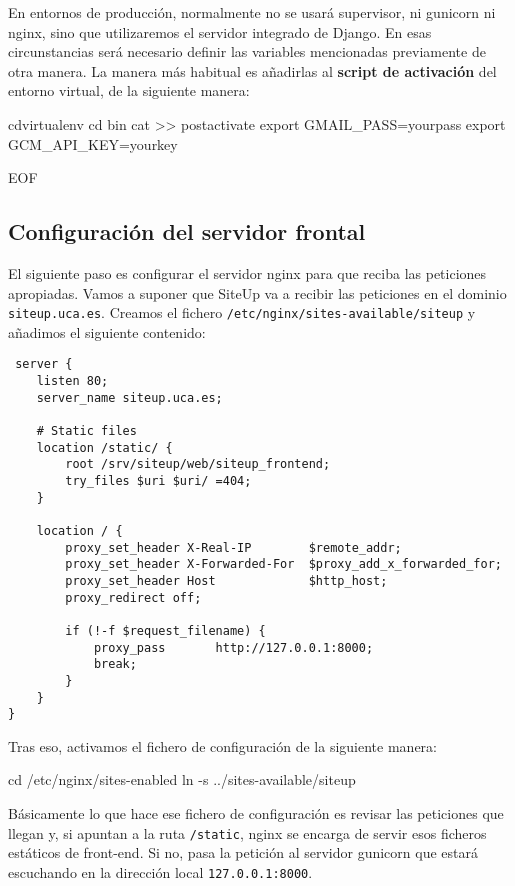 En entornos de producción, normalmente no se usará supervisor, ni gunicorn ni
nginx, sino que utilizaremos el servidor integrado de Django. En esas
circunstancias será necesario definir las variables mencionadas previamente de
otra manera. La manera más habitual es añadirlas al \textbf{script de activación} del
entorno virtual, de la siguiente manera:

\begin{bashcode}
cdvirtualenv
cd bin
cat >> postactivate
export GMAIL_PASS=yourpass
export GCM_API_KEY=yourkey

EOF
\end{bashcode}

\subsection{Configuración del servidor frontal}

El siguiente paso es configurar el servidor nginx para que reciba las peticiones
apropiadas. Vamos a suponer que SiteUp va a recibir las peticiones en el dominio
\texttt{siteup.uca.es}. Creamos el fichero
\texttt{/etc/nginx/sites-available/siteup} y añadimos el siguiente contenido:

\begin{verbatim}
 server {
    listen 80;
    server_name siteup.uca.es;

    # Static files
    location /static/ {
        root /srv/siteup/web/siteup_frontend;
        try_files $uri $uri/ =404;
    }

    location / {
        proxy_set_header X-Real-IP        $remote_addr;
        proxy_set_header X-Forwarded-For  $proxy_add_x_forwarded_for;
        proxy_set_header Host             $http_host;
        proxy_redirect off;

        if (!-f $request_filename) {
            proxy_pass       http://127.0.0.1:8000;
            break;
        }
    }
} 
\end{verbatim}

Tras eso, activamos el fichero de configuración de la siguiente manera:

\begin{bashcode}
cd /etc/nginx/sites-enabled
ln -s ../sites-available/siteup
\end{bashcode}

Básicamente lo que hace ese fichero de configuración es revisar las peticiones
que llegan y, si apuntan a la ruta \texttt{/static}, nginx se encarga de servir
esos ficheros estáticos de front-end. Si no, pasa la petición al servidor
gunicorn que estará escuchando en la dirección local \texttt{127.0.0.1:8000}.

